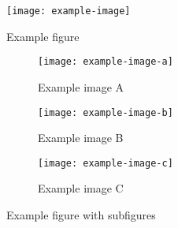 \documentclass{article}
\begin{document}
\begin{figure}
    \centering
    \texttt{[image: example-image]}
    \caption{Example figure}
    \label{fig:example}
\end{figure}

\begin{figure}
    \centering
    \begin{subfigure}{0.45\textwidth}
        \centering
        \texttt{[image: example-image-a]}
        \caption{Example image A}
        \label{fig:example A}
    \end{subfigure}
    \hfill
    \begin{subfigure}{0.45\textwidth}
        \centering
        \texttt{[image: example-image-b]}
        \caption{Example image B}
        \label{fig:example B}
    \end{subfigure}
    \newline
    \begin{subfigure}{0.45\textwidth}
        \centering
        \texttt{[image: example-image-c]}
        \caption{Example image C}
        \label{fig:example C}
    \end{subfigure}
    \caption{Example figure with subfigures}
    \label{fig:example with subfigures}
\end{figure}
\end{document}
